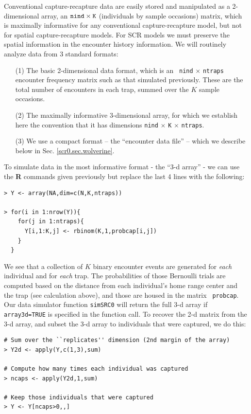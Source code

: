 Conventional capture-recapture data are easily stored and manipulated
as a 2-dimensional array, an $\mbox{\tt nind} \times \mbox{\tt
  K}$ (individuals by sample occasions) matrix, which is maximally informative for any
conventional capture-recapture model, but not for spatial
capture-recapture models.  For SCR models we must preserve the spatial
information in the encounter history information. We will routinely
analyze data from 3 standard formats:
\begin{itemize}
\item[(1)] The basic 2-dimensional data format, which is an \mbox{\tt
    nind} $\times$ \mbox{\tt ntraps} encounter frequency matrix such
  as that simulated previously. These are the total number of encounters in each
  trap, summed over the $K$ sample occasions.
\item[(2)] The maximally informative 3-dimensional array, for which we
  establish here the convention that it has dimensions \mbox{\tt nind}
  $\times$ \mbox{\tt K} $\times$ \mbox{\tt ntraps}.
\item[(3)] We use a compact format -- the ``encounter data file'' -- which
  we describe below in Sec. \ref{scr0.sec.wolverine}.
\end{itemize}
To simulate data in the most informative format - the ``3-d array'' -
we can use the {\bf R} commands given previously but replace the last
4 lines with the following:
{\small
\begin{verbatim}
> Y <- array(NA,dim=c(N,K,ntraps))

> for(i in 1:nrow(Y)){
    for(j in 1:ntraps){
      Y[i,1:K,j] <- rbinom(K,1,probcap[i,j])
    }
  }
\end{verbatim}
}

We see that a collection of $K$ binary encounter events are
generated for {\it each} individual and for {\it each} trap.  The
probabilities of those Bernoulli trials are computed based on the
distance from each individual's home range center and the trap (see
calculation above), and those are housed in the matrix \mbox{\tt
  probcap}. Our data simulator function \mbox{\tt simSRC0} will
return the full 3-d array if \mbox{\tt array3d=TRUE} is specified in
the function call.  To recover the 2-d matrix from the 3-d array, and
subset the 3-d array to individuals that were captured, we do this:
{\small
\begin{verbatim}
# Sum over the ``replicates'' dimension (2nd margin of the array)
> Y2d <- apply(Y,c(1,3),sum)

# Compute how many times each individual was captured
> ncaps <- apply(Y2d,1,sum)

# Keep those individuals that were captured
> Y <- Y[ncaps>0,,]
\end{verbatim}
}

